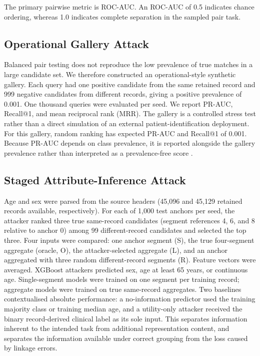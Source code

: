 \documentclass[journal]{IEEEtran}
\begin{document}
The primary pairwise metric is ROC-AUC. An ROC-AUC of 0.5 indicates chance
ordering, whereas 1.0 indicates complete separation in the sampled pair task.

\subsection{Operational Gallery Attack}
\label{subsec:operational}

Balanced pair testing does not reproduce the low prevalence of true matches in
a large candidate set. We therefore constructed an operational-style
synthetic gallery. Each query had one positive candidate from the same
retained record and 999 negative candidates from different records, giving a
positive prevalence of 0.001. One thousand queries were evaluated per seed.
We report PR-AUC, Recall@1, and mean reciprocal rank (MRR).
The gallery is a controlled stress test rather than a direct simulation of an
external patient-identification deployment. For this gallery, random ranking
has expected PR-AUC and Recall@1 of 0.001. Because PR-AUC depends on class
prevalence, it is reported alongside the gallery prevalence rather than
interpreted as a prevalence-free score
\cite{DavisGoadrich2006PRROC,SaitoRehmsmeier2015PR}.

\subsection{Staged Attribute-Inference Attack}
\label{subsec:attribute-attack}

Age and sex were parsed from the source headers (45,096 and 45,129 retained
records available, respectively). For each of 1,000 test anchors per seed, the
attacker ranked three true same-record candidates (segment references 4, 6,
and 8 relative to anchor 0) among 99 different-record candidates and selected
the top three. Four inputs were compared: one anchor segment (S), the true
four-segment aggregate (oracle, O), the attacker-selected aggregate (L), and
an anchor aggregated with three random different-record segments (R). Feature
vectors were averaged. XGBoost attackers predicted sex, age at least 65 years,
or continuous age. Single-segment models were trained on one segment per
training record; aggregate models were trained on true same-record aggregates.
Two baselines contextualised absolute performance: a no-information predictor
used the training majority class or training median age, and a utility-only
attacker received the binary record-derived clinical label as its sole input.
This separates information inherent to the intended task from additional
representation content, and separates the information available under correct
grouping from the loss caused by linkage errors.
\end{document}
